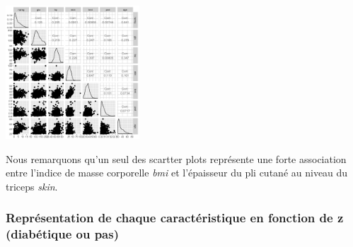 \documentclass[10pt]{article}
\begin{document}
\begin{center}
	\includegraphics[width=50mm]{Figures/Pima/plot_Pimaquant.png}
	\label{fig:plot_pima_quantitatives}
\end{center}

Nous remarquons qu'un seul des scartter plots représente une forte association entre l'indice de masse corporelle \textit{bmi} et l'épaisseur du pli cutané au niveau du triceps \textit{skin}.

\subsubsection{Représentation de chaque caractéristique en fonction de z (diabétique ou pas)}
\end{document}

